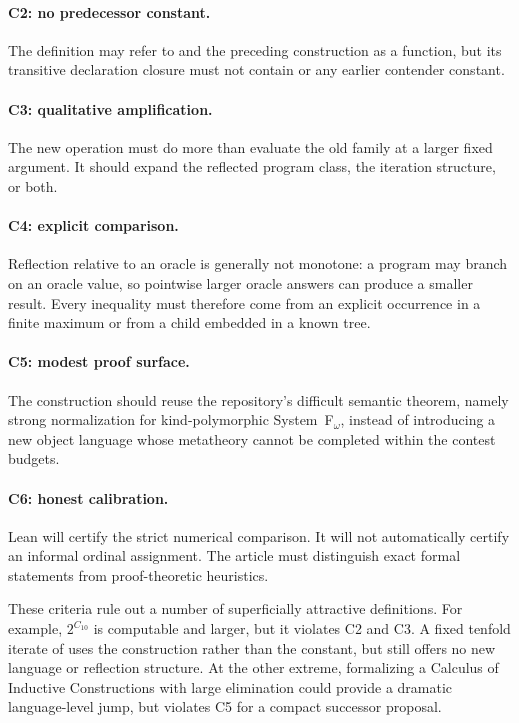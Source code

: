 \documentclass[11pt]{article}
\theoremstyle{definition}
\theoremstyle{remark}
\newcommand{\lean}[1]{\texttt{\detokenize{#1}}}
\newcommand{\Cten}{C_{10}}
\begin{document}
\paragraph{C2: no predecessor constant.}
The definition may refer to \lean{F10} and the preceding construction as a
function, but its transitive declaration closure must not contain
\lean{contender_10} or any earlier contender constant.

\paragraph{C3: qualitative amplification.}
The new operation must do more than evaluate the old family at a larger fixed
argument. It should expand the reflected program class, the iteration
structure, or both.

\paragraph{C4: explicit comparison.}
Reflection relative to an oracle is generally not monotone: a program may branch
on an oracle value, so pointwise larger oracle answers can produce a smaller
result. Every inequality must therefore come from an explicit occurrence in a
finite maximum or from a child embedded in a known tree.

\paragraph{C5: modest proof surface.}
The construction should reuse the repository's difficult semantic theorem,
namely strong normalization for kind-polymorphic System~F$_\omega$, instead of
introducing a new object language whose metatheory cannot be completed within
the contest budgets.

\paragraph{C6: honest calibration.}
Lean will certify the strict numerical comparison. It will not automatically
certify an informal ordinal assignment. The article must distinguish exact
formal statements from proof-theoretic heuristics.

These criteria rule out a number of superficially attractive definitions. For
example, $2^{\Cten}$ is computable and larger, but it violates C2 and C3. A
fixed tenfold iterate of \lean{F10} uses the construction rather than the
constant, but still offers no new language or reflection structure. At the
other extreme, formalizing a Calculus of Inductive Constructions with large
elimination could provide a dramatic language-level jump, but violates C5 for a
compact successor proposal.
\end{document}
